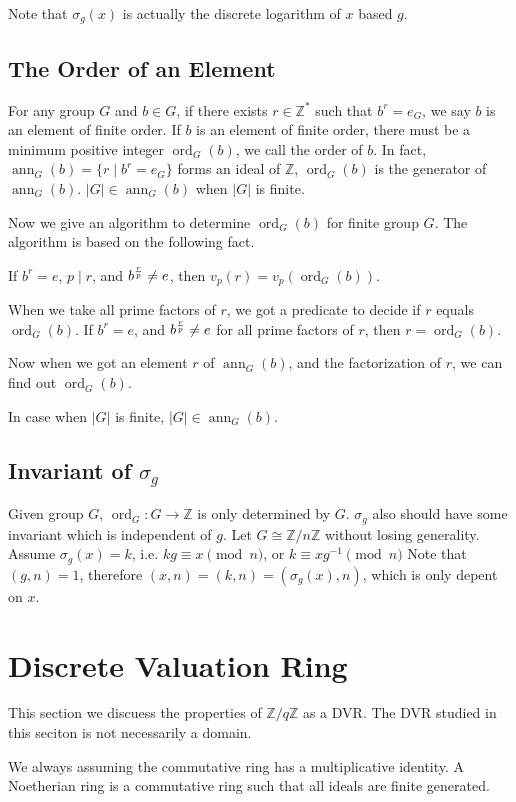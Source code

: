 \documentclass{article}
\def\abs#1{\left| {#1} \right|}
\def\zmod#1{\mathbb Z / {#1} \mathbb Z}
\def\ann{\mathop{\mathrm{ann}}}
\def\ord{\mathop{\mathrm{ord}}}
\begin{document}
Note that $\sigma_g(x)$ is actually the discrete logarithm of $x$ based $g$.

\subsection{The Order of an Element}
For any group $G$ and $b \in G$, if there exists $r \in \mathbb Z^\ast$ such that $b^r = e_G$,
we say $b$ is an element of finite order. If $b$ is an element of finite order,
there must be a minimum positive integer $\ord_G(b)$, we call the order of $b$.
In fact, $\ann_G(b) = \{r \mid b^r = e_G\}$ forms an ideal of $\mathbb Z$,
$\ord_G(b)$ is the generator of $\ann_G(b)$. $\abs G \in \ann_G(b)$ when $\abs G$ is finite.

Now we give an algorithm to determine $\ord_G(b)$ for finite group $G$.
The algorithm is based on the following fact.

If $b^r = e$, $p \mid r$, and $b^{r \over p} \neq e$, then $v_p(r) = v_p(\ord_G(b))$.

When we take all prime factors of $r$, we got a predicate to decide if $r$ equals $\ord_G(b)$.
If $b^r = e$, and $b^{r \over p} \neq e$ for all prime factors of $r$, then $r = \ord_G(b)$.

Now when we got an element $r$ of $\ann_G(b)$, and the factorization of $r$,
we can find out $\ord_G(b)$.

In case when $\abs G$ is finite, $\abs G \in \ann_G(b)$.

\subsection{Invariant of $\sigma_g$}
Given group $G$, $\ord_G : G \to \mathbb Z$ is only determined by $G$.
$\sigma_g$ also should have some invariant which is independent of $g$.
Let $G \cong \zmod n$ without losing generality.
Assume $\sigma_g(x) = k$, i.e. $kg \equiv x \pmod n$, or $k \equiv xg^{-1} \pmod n$
Note that $(g, n) = 1$, therefore $(x, n) = (k, n) = (\sigma_g(x), n)$, which is
only depent on $x$.

\section{Discrete Valuation Ring}
This section we discuess the properties of $\mathbb Z / q \mathbb Z$ as a DVR.
The DVR studied in this seciton is not necessarily a domain.

We always assuming the commutative ring has a multiplicative identity.
A Noetherian ring is a commutative ring such that all ideals are finite generated.
\end{document}
